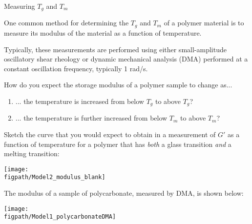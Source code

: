 \begin{activity}{Measuring $T_g$ and $T_m$}
\begin{instructornotes}
\end{instructornotes}



\begin{model}
	\label{\labelbase:mdl:DMA}
	
	One common method for determining the $T_g$ and $T_m$ of a polymer material is to measure its modulus of the material as a function of temperature.
	
	Typically, these measurements are performed using either small-amplitude oscillatory shear rheology or dynamic mechanical analysis (DMA) performed at a constant oscillation frequency, typically 1 rad/s.
	
\end{model}


\begin{ctqs}

	\question How do you expect the storage modulus of a polymer sample to change as...
	
		\begin{enumerate}
			\item ... the temperature is increased from below $T_g$ to above $T_g$?
			
				\begin{solution}[0.75in]
				\end{solution}
			
			\item ... the temperature is further increased from below $T_m$ to above $T_m$?
			
				\begin{solution}[0.75in]
				\end{solution}
		
		\end{enumerate}
		
	\question Sketch the curve that you would expect to obtain in a measurement of $G'$ as a function of temperature for a polymer that has \emph{both} a glass transition \emph{and} a melting transition:
	
		\vspace{6pt}
		\centerline{\texttt{[image: \\figpath/Model2\_modulus\_blank]}}
		
	
	\clearpage
	\question The modulus of a sample of polycarbonate, measured by DMA, is shown below:
	
		\vspace{6pt}
		\centerline{\texttt{[image: \\figpath/Model1\_polycarbonateDMA]}}
		

\end{ctqs}
\end{activity}
